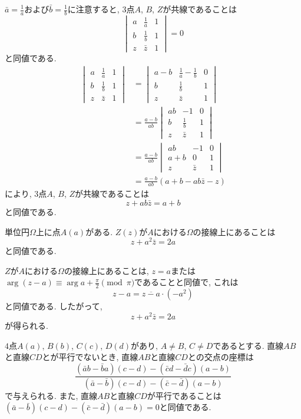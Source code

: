 \begin{prf*}
$\bar a=\frac 1a$および$\bar b=\frac 1b$に注意すると, $3$点$A$, $B$, $Z$が共線であることは
\[\begin{vmatrix}a&\frac 1a&1\\b&\frac 1b&1\\z&\bar z&1\end{vmatrix}=0\]
と同値である.
\begin{align*}
\begin{vmatrix}a&\frac 1a&1\\b&\frac 1b&1\\z&\bar z&1\end{vmatrix}
&=\begin{vmatrix}a-b&\frac 1a-\frac 1b&0\\b&\frac 1b&1\\z&\bar z&1\end{vmatrix}\\
&=\frac{a-b}{ab}\begin{vmatrix}ab&-1&0\\b&\frac 1b&1\\z&\bar z&1\end{vmatrix}\\
&=\frac{a-b}{ab}\begin{vmatrix}ab&-1&0\\a+b&0&1\\z&\bar z&1\end{vmatrix}\\
&=\frac{a-b}{ab}(a+b-ab\bar z-z)
\end{align*}
により, $3$点$A$, $B$, $Z$が共線であることは
\[z+ab\bar z=a+b\]
と同値である.
\end{prf*}
%
%
\begin{bthm}
単位円$\Omega$上に点$A(a)$がある.
$Z(z)$が$A$における$\Omega$の接線上にあることは
\[z+a^2\bar z=2a\]
と同値である.
\end{bthm}
\begin{prf*}
$Z$が$A$における$\Omega$の接線上にあることは, $z=a$または$\arg(z-a)\equiv\arg a+\frac\pi 2\pmod\pi$であることと同値で, これは
\[z-a=\overline{z-a}\cdot(-a^2)\]
と同値である.
したがって,
\[z+a^2\bar z=2a\]
が得られる.
\end{prf*}
%
%
\begin{bthm}\label{thm:intersection1}
$4$点$A(a)$, $B(b)$, $C(c)$, $D(d)$があり, $A\neq B$, $C\neq D$であるとする.
直線$AB$と直線$CD$とが平行でないとき, 直線$AB$と直線$CD$との交点の座標は
\[
\frac{(\bar{a}b-\bar{b}a)(c-d)-(\bar{c}d-\bar{d}c)(a-b)}{(\bar{a}-\bar{b})(c-d)-(\bar{c}-\bar{d})(a-b)}
\]
で与えられる.
また, 直線$AB$と直線$CD$が平行であることは$(\bar{a}-\bar{b})(c-d)-(\bar{c}-\bar{d})(a-b)=0$と同値である.
\end{bthm}
